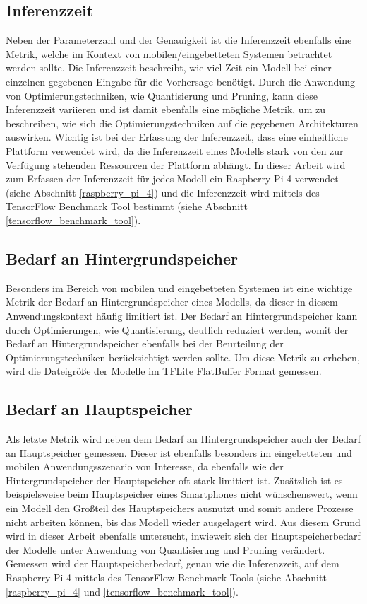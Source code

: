 \subsection{Inferenzzeit}
Neben der Parameterzahl und der Genauigkeit ist die Inferenzzeit ebenfalls eine Metrik, welche im Kontext von mobilen/eingebetteten Systemen betrachtet werden sollte. Die Inferenzzeit beschreibt, wie viel Zeit ein Modell bei einer einzelnen gegebenen Eingabe für die Vorhersage benötigt. Durch die Anwendung von Optimierungstechniken, wie Quantisierung und Pruning, kann diese Inferenzzeit variieren und ist damit ebenfalls eine mögliche Metrik, um zu beschreiben, wie sich die Optimierungstechniken auf die gegebenen Architekturen auswirken. Wichtig ist bei der Erfassung der Inferenzzeit, dass eine einheitliche Plattform verwendet wird, da die Inferenzzeit eines Modells stark von den zur Verfügung stehenden Ressourcen der Plattform abhängt. In dieser Arbeit wird zum Erfassen der Inferenzzeit für jedes Modell ein Raspberry Pi 4 verwendet (siehe Abschnitt \ref{raspberry_pi_4}) und die Inferenzzeit wird mittels des TensorFlow Benchmark Tool bestimmt (siehe Abschnitt \ref{tensorflow_benchmark_tool}).


\subsection{Bedarf an Hintergrundspeicher}
Besonders im Bereich von mobilen und eingebetteten Systemen ist eine wichtige Metrik der Bedarf an Hintergrundspeicher eines Modells, da dieser in diesem Anwendungskontext häufig limitiert ist. Der Bedarf an Hintergrundspeicher kann durch Optimierungen, wie Quantisierung, deutlich reduziert werden, womit der Bedarf an Hintergrundspeicher ebenfalls bei der Beurteilung der Optimierungstechniken berücksichtigt werden sollte. Um diese Metrik zu erheben, wird die Dateigröße der Modelle im TFLite FlatBuffer Format gemessen.


\subsection{Bedarf an Hauptspeicher}
Als letzte Metrik wird neben dem Bedarf an Hintergrundspeicher auch der Bedarf an Hauptspeicher gemessen. Dieser ist ebenfalls besonders im eingebetteten und mobilen Anwendungsszenario von Interesse, da ebenfalls wie der Hintergrundspeicher der Hauptspeicher oft stark limitiert ist. Zusätzlich ist es beispielsweise beim Hauptspeicher eines Smartphones nicht wünschenswert, wenn ein Modell den Großteil des Hauptspeichers ausnutzt und somit andere Prozesse nicht arbeiten können, bis das Modell wieder ausgelagert wird. Aus diesem Grund wird in dieser Arbeit ebenfalls untersucht, inwieweit sich der Hauptspeicherbedarf der Modelle unter Anwendung von Quantisierung und Pruning verändert. Gemessen wird der Hauptspeicherbedarf, genau wie die Inferenzzeit, auf dem Raspberry Pi 4 mittels des TensorFlow Benchmark Tools (siehe Abschnitt \ref{raspberry_pi_4} und \ref{tensorflow_benchmark_tool}).


